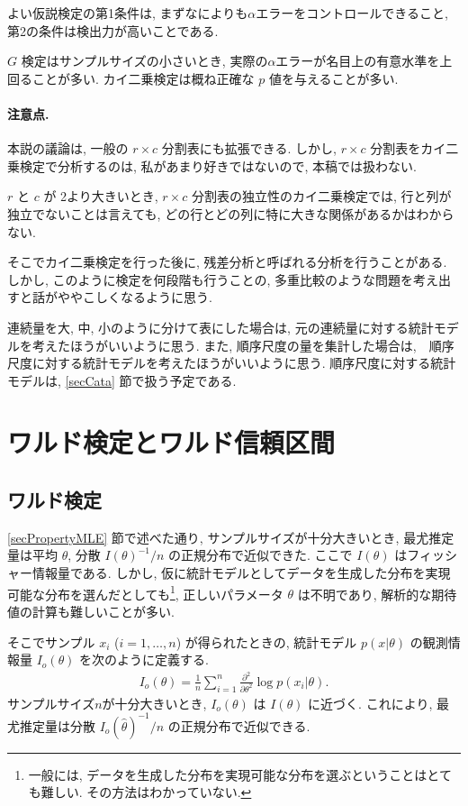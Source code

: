 \documentclass[a4paper, 12pt]{jarticle}
\begin{document}
よい仮説検定の第1条件は, まずなによりも$\alpha$エラーをコントロールできること, 第2の条件は検出力が高いことである. 

$G$ 検定はサンプルサイズの小さいとき, 実際の$\alpha$エラーが名目上の有意水準を上回ることが多い. 
カイ二乗検定は概ね正確な $p$ 値を与えることが多い.

\paragraph{注意点. } 本説の議論は, 一般の $r \times c$ 分割表にも拡張できる. しかし, $r \times c$ 分割表をカイ二乗検定で分析するのは, 私があまり好きではないので, 本稿では扱わない.

$r$ と $c$ が 2より大きいとき, $r \times c$ 分割表の独立性のカイ二乗検定では, 行と列が独立でないことは言えても, どの行とどの列に特に大きな関係があるかはわからない. 

そこでカイ二乗検定を行った後に, 残差分析と呼ばれる分析を行うことがある. しかし, このように検定を何段階も行うことの, 多重比較のような問題を考え出すと話がややこしくなるように思う.  

連続量を大, 中, 小のように分けて表にした場合は, 元の連続量に対する統計モデルを考えたほうがいいように思う. また, 順序尺度の量を集計した場合は,　順序尺度に対する統計モデルを考えたほうがいいように思う. 
順序尺度に対する統計モデルは, \ref{secCata} 節で扱う予定である. 

\section{ワルド検定とワルド信頼区間}
\subsection{ワルド検定}
\label{secWaldtest}
\ref{secPropertyMLE} 節で述べた通り, サンプルサイズが十分大きいとき, 最尤推定量は平均 $\theta$, 分散 $I(\theta)^{-1}/n$ の正規分布で近似できた. ここで $I(\theta)$ はフィッシャー情報量である. 
しかし, 仮に統計モデルとしてデータを生成した分布を実現可能な分布を選んだとしても\footnote{一般には, データを生成した分布を実現可能な分布を選ぶということはとても難しい. その方法はわかっていない. }, 正しいパラメータ $\theta$ は不明であり, 解析的な期待値の計算も難しいことが多い. 
 
そこでサンプル $x_i$ ($i=1,\ldots,n$) が得られたときの, 統計モデル $p(x|\theta)$ の観測情報量 $I_o(\theta)$ を次のように定義する.
\begin{align}
I_o(\theta)=\frac{1}{n}\sum_{i=1}^{n} \frac{\partial^2}{\partial \theta^2}\log p(x_i|\theta).
\end{align}
サンプルサイズ$n$が十分大きいとき, $I_o(\theta)$ は $I(\theta)$ に近づく. 
これにより, 最尤推定量は分散 $I_o(\hat \theta)^{-1}/n$ の正規分布で近似できる. 
\end{document}
